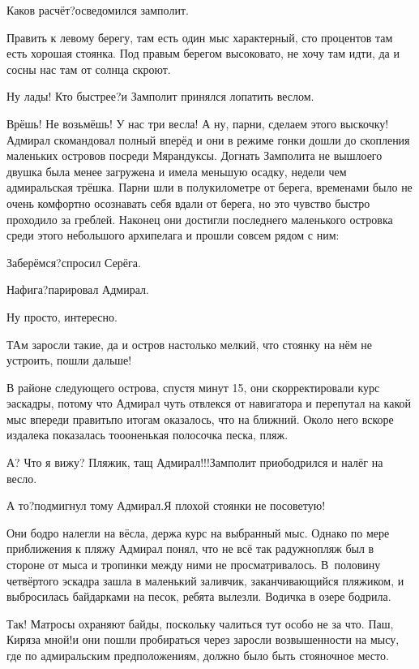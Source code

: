 \diagdash Каков расчёт?\mdash осведомился замполит.

\diagdash Править к левому берегу, там есть один мыс характерный, сто процентов там есть хорошая стоянка. Под правым берегом высоковато, не хочу там идти, да и сосны нас там от солнца скроют.

\diagdash Ну лады! Кто быстрее?\mdash и Замполит принялся лопатить веслом.

\diagdash Врёшь! Не возьмёшь! У нас три весла! А ну, парни, сделаем этого выскочку!\mdash Адмирал скомандовал полный вперёд и они в режиме гонки дошли до скопления маленьких островов посреди Мярандуксы. Догнать Замполита не вышло\mdash его двушка была менее загружена и имела меньшую осадку, недели чем адмиральская трёшка. Парни шли в полукилометре от берега, временами было не очень комфортно осознавать себя вдали от берега, но это чувство быстро проходило за греблей. Наконец они достигли последнего маленького островка среди этого небольшого архипелага и прошли совсем рядом с ним:

\diagdash Заберёмся?\mdash спросил Серёга.

\diagdash Нафига?\mdash парировал Адмирал.

\diagdash Ну просто, интересно.

\diagdash ТАм заросли такие, да и остров настолько мелкий, что стоянку на нём не устроить, пошли дальше!

В районе следующего острова, спустя минут 15, они скорректировали курс эаскадры, потому что Адмирал чуть отвлекся от навигатора и перепутал на какой мыс впереди править\mdash по итогам оказалось, что на ближний. Около него вскоре издалека показалась то\sdash о\sdash оненькая полосочка песка, пляж.

\diagdash А? Что я вижу? Пляжик, тащ Адмирал!!!\mdash Замполит приободрился и налёг на весло.

\diagdash А то?\mdash подмигнул тому Адмирал.\mdash Я плохой стоянки не посоветую!

Они бодро налегли на вёсла, держа курс на выбранный мыс. Однако по мере приближения к пляжу Адмирал понял, что не всё так радужно\mdash пляж был в стороне от мыса и тропинки между ними не просматривалось. В~половину четвёртого эскадра зашла в маленький заливчик, заканчивающийся пляжиком, и выбросилась байдарками на песок, ребята вылезли. Водичка в озере бодрила.

\diagdash Так! Матросы охраняют байды, поскольку чалиться тут особо не за что. Паш, Киря\mdash за мной!\mdash и они пошли пробираться через заросли возвышенности на мысу, где по адмиральским предположениям, должно было быть стояночное место.

